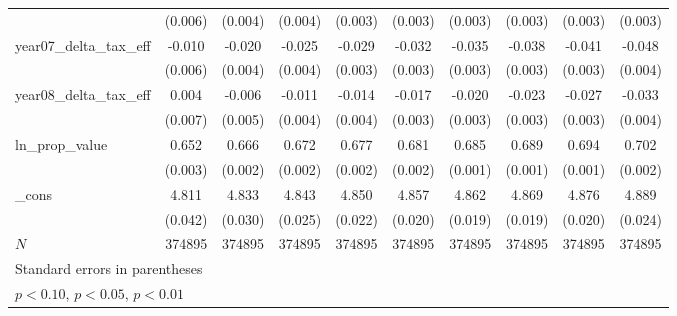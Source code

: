 {\begin{tabular}{l*{9}{c}}
            &     (0.006)         &     (0.004)         &     (0.004)         &     (0.003)         &     (0.003)         &     (0.003)         &     (0.003)         &     (0.003)         &     (0.003)         \\
[1em]
year07_delta_tax_eff&      -0.010\sym{*}  &      -0.020\sym{***}&      -0.025\sym{***}&      -0.029\sym{***}&      -0.032\sym{***}&      -0.035\sym{***}&      -0.038\sym{***}&      -0.041\sym{***}&      -0.048\sym{***}\\
            &     (0.006)         &     (0.004)         &     (0.004)         &     (0.003)         &     (0.003)         &     (0.003)         &     (0.003)         &     (0.003)         &     (0.004)         \\
[1em]
year08_delta_tax_eff&       0.004         &      -0.006         &      -0.011\sym{**} &      -0.014\sym{***}&      -0.017\sym{***}&      -0.020\sym{***}&      -0.023\sym{***}&      -0.027\sym{***}&      -0.033\sym{***}\\
            &     (0.007)         &     (0.005)         &     (0.004)         &     (0.004)         &     (0.003)         &     (0.003)         &     (0.003)         &     (0.003)         &     (0.004)         \\
[1em]
ln_prop_value&       0.652\sym{***}&       0.666\sym{***}&       0.672\sym{***}&       0.677\sym{***}&       0.681\sym{***}&       0.685\sym{***}&       0.689\sym{***}&       0.694\sym{***}&       0.702\sym{***}\\
            &     (0.003)         &     (0.002)         &     (0.002)         &     (0.002)         &     (0.002)         &     (0.001)         &     (0.001)         &     (0.001)         &     (0.002)         \\
[1em]
_cons       &       4.811\sym{***}&       4.833\sym{***}&       4.843\sym{***}&       4.850\sym{***}&       4.857\sym{***}&       4.862\sym{***}&       4.869\sym{***}&       4.876\sym{***}&       4.889\sym{***}\\
            &     (0.042)         &     (0.030)         &     (0.025)         &     (0.022)         &     (0.020)         &     (0.019)         &     (0.019)         &     (0.020)         &     (0.024)         \\
\hline
\(N\)       &      374895         &      374895         &      374895         &      374895         &      374895         &      374895         &      374895         &      374895         &      374895         \\
\hline\hline
\multicolumn{10}{p{\linewidth}}{\footnotesize Standard errors in parentheses}\\
\multicolumn{10}{p{\linewidth}}{\footnotesize \sym{*} \(p<0.10\), \sym{**} \(p<0.05\), \sym{***} \(p<0.01\)}\\
\end{tabular}
}
